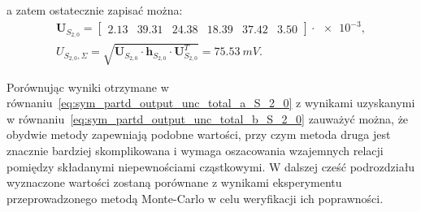 a zatem ostatecznie zapisać można:
\begin{gather}
\mathbf{U}_{S_{2,0}} =
\begin{bmatrix}
\num{2.13} & \num{39.31} & \num{24.38} & \num{18.39} & \num{37.42} & \num{3.50}
\end{bmatrix} \cdot \num{e-3}
\label{eq:sym_partd_output_unc_sumuvectval_S_2_0}, \\
U_{S_{2,0},\Sigma} = \sqrt{\mathbf{U}_{S_{2,0}} \cdot \mathbf{h}_{S_{2,0}} \cdot \mathbf{U}_{S_{2,0}}^{T}} = \qty{75.53}{mV} \label{eq:sym_partd_output_unc_total_b_S_2_0}.
\end{gather}

Porównując wyniki otrzymane w równaniu~\eqref{eq:sym_partd_output_unc_total_a_S_2_0} z wynikami uzyskanymi w równaniu~\eqref{eq:sym_partd_output_unc_total_b_S_2_0} zauważyć można, że obydwie metody zapewniają podobne wartości, przy czym metoda druga jest znacznie bardziej skomplikowana i wymaga oszacowania wzajemnych relacji pomiędzy składanymi niepewnościami cząstkowymi. W dalszej cześć podrozdziału wyznaczone wartości zostaną porównane z wynikami eksperymentu przeprowadzonego metodą Monte-Carlo w celu weryfikacji ich poprawności.

